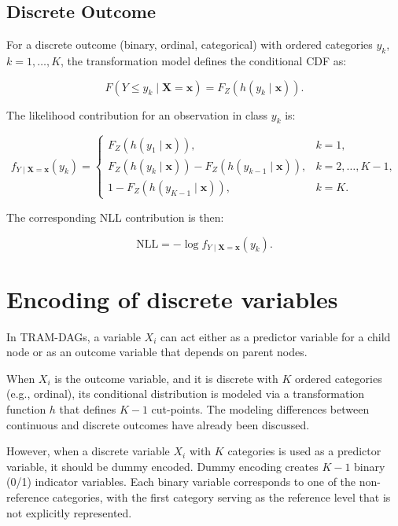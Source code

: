 \subsection{Discrete Outcome}

For a discrete outcome (binary, ordinal, categorical) with ordered categories $y_k$, $k = 1, \ldots, K$, the transformation model defines the conditional CDF as:

\begin{equation}
F(Y \leq y_k \mid \mathbf{X} = \mathbf{x}) = F_Z(h(y_k \mid \mathbf{x})).
\end{equation}

The likelihood contribution for an observation in class $y_k$ is:

\begin{equation}
f_{Y \mid \mathbf{X} = \mathbf{x}}(y_k) =
\begin{cases}
F_Z(h(y_1 \mid \mathbf{x})), & k = 1, \\
F_Z(h(y_k \mid \mathbf{x})) - F_Z(h(y_{k-1} \mid \mathbf{x})), & k = 2, \ldots, K - 1, \\
1 - F_Z(h(y_{K-1} \mid \mathbf{x})), & k = K.
\end{cases}
\end{equation}

The corresponding NLL contribution is then:

\begin{equation}
\text{NLL} = - \log f_{Y \mid \mathbf{X} = \mathbf{x}}(y_k).
\end{equation}






\section{Encoding of discrete variables} \label{sec:encoding_discrete_variables}

In TRAM-DAGs, a variable $X_i$ can act either as a predictor variable for a child node or as an outcome variable that depends on parent nodes.

When $X_i$ is the outcome variable, and it is discrete with $K$ ordered categories (e.g., ordinal), its conditional distribution is modeled via a transformation function $h$ that defines $K-1$ cut-points. The modeling differences between continuous and discrete outcomes have already been discussed.

However, when a discrete variable $X_i$ with $K$ categories is used as a predictor variable, it should be dummy encoded. Dummy encoding creates $K - 1$ binary (0/1) indicator variables. Each binary variable corresponds to one of the non-reference categories, with the first category serving as the reference level that is not explicitly represented.

